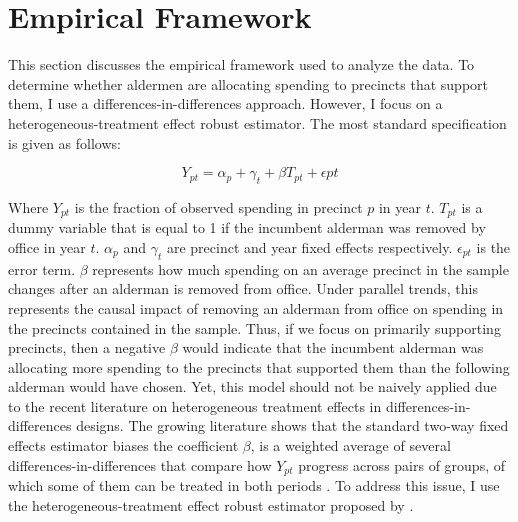 \section{Empirical Framework}\label{sec:empframe}
This section discusses the empirical framework used to analyze the data.
To determine whether aldermen are allocating spending to precincts that support them, I use a differences-in-differences approach.
However, I focus on a heterogeneous-treatment effect robust estimator.
The most standard specification is given as follows:

\begin{equation}\label{eq:standard_did}
    Y_{pt} = \alpha_{p} + \gamma_{t} + \beta T_{pt} + \epsilon{pt}
\end{equation}

Where $Y_{pt}$ is the fraction of observed spending in precinct $p$ in year $t$. $T_{pt}$ is a dummy variable that is equal to 1 if the incumbent alderman was removed by office in year $t$. $\alpha_{p}$ and $\gamma_{t}$ are precinct and year fixed effects respectively. $\epsilon_{pt}$ is the error term.
$\beta$ represents how much spending on an average precinct in the sample changes after an alderman is removed from office.
Under parallel trends, this represents the causal impact of removing an alderman from office on spending in the precincts contained in the sample.
Thus, if we focus on primarily supporting precincts, then a negative $\beta$ would indicate that the incumbent alderman was allocating more spending to the precincts that supported them than the following alderman would have chosen.
Yet, this model should not be naively applied due to the recent literature on heterogeneous treatment effects in differences-in-differences designs.
The growing literature shows that the standard two-way fixed effects estimator biases the coefficient $\beta$, is a weighted average of several differences-in-differences that compare how $Y_{pt}$ progress across pairs of groups, of which some of them can be treated in both periods \cite{chaisetwfe} \cite{CALLAWAY2021200}. 
To address this issue, I use the heterogeneous-treatment effect robust estimator proposed by \cite{CALLAWAY2021200}.

